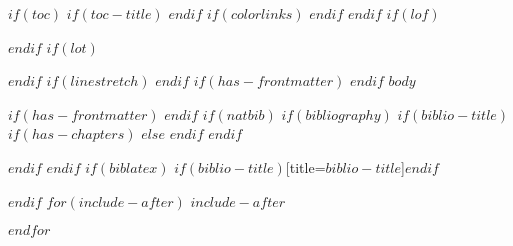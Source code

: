 \documentclass[
$if(fontsize)$
  $fontsize$,
$endif$
$if(papersize)$
  $papersize$paper,
$endif$
$for(classoption)$
  $classoption$$sep$,
$endfor$
]{book}
\newlength\longest
\theoremstyle{nonumberplain}
\begin{document}
\clearpage


\thispagestyle{empty}

\clearpage
\newcommand{\quotename}{Quote}
\pdfbookmark{\quotename}{quote}
\thispagestyle{empty}
\null\vfill

\settowidth{}

\justify

\vfill\vfill\vfill



$if(toc)$
$if(toc-title)$
\renewcommand*\contentsname{$toc-title$}
$endif$
{
$if(colorlinks)$
\hypersetup{linkcolor=$if(toccolor)$$toccolor$$else$$endif$}
$endif$
\setcounter{tocdepth}{$toc-depth$}
\tableofcontents
}
$endif$
$if(lof)$
\listoffigures
$endif$
$if(lot)$
\listoftables
$endif$
$if(linestretch)$
$endif$
$if(has-frontmatter)$
\mainmatter
$endif$
$body$

$if(has-frontmatter)$
\backmatter
$endif$
$if(natbib)$
$if(bibliography)$
$if(biblio-title)$
$if(has-chapters)$
\renewcommand\bibname{$biblio-title$}
$else$
\renewcommand\refname{$biblio-title$}
$endif$
$endif$
  

$endif$
$endif$
$if(biblatex)$
\printbibliography$if(biblio-title)$[title=$biblio-title$]$endif$

$endif$
$for(include-after)$
$include-after$

$endfor$
\end{document}
